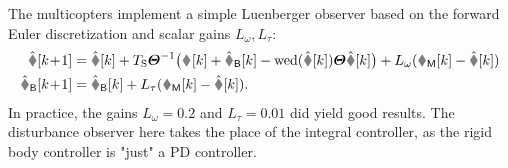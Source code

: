 The multicopters implement a simple Luenberger observer based on the forward Euler discretization and scalar gains $L_\omega, L_\tau$: 
\begin{subequations}\label{eq:AngVelObs}
\begin{align}
 \wObs[\kPlusOne] &= \wObs[k] + \Ts \J^{-1} \big( \bodyTorque{}{}[k] + \tauBObs[k] - \wedOp(\wObs[k]) \J \wObs[k] \big) + L_\omega (\wIMU[k] - \wObs[k])
\\
 \tauBObs[\kPlusOne] &= \tauBObs[k] + L_\tau (\wIMU[k] - \wObs[k])
 .
\end{align}
\end{subequations}
In practice, the gains $L_\omega = 0.2$ and $L_\tau=0.01$ did yield good results.
The disturbance observer here takes the place of the integral controller, as the rigid body controller is "just" a PD controller.

